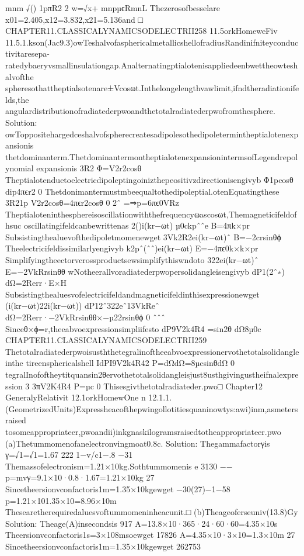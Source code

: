 {{{{{{{{{{{{{{{{mnm
√()
1pπR2
2
w=√x+
mnpµϵRmnL
Thezerosofbesselare
x01=2.405,x12=3.832,x21=5.136and
□
CHAPTER11.CLASSICALYNAMICSODELECTRII258
11.5orkHomeweFiv
11.5.1.kson(Jac9.3)owTeshalvofasphericalmetallicshellofradiusRandinifniteyconductivitaresepa-
ratedybaeryvsmallinsulationgap.Analternatingptialotenisappliedeenbwettheowteshalvofthe
spheresothattheptialsotenare±Vcosωt.Inthelongelengthvawlimit,ifndtheradiationifelds,the
angulardistributionofradiatederpwoandthetotalradiatederpwofromthesphere.
Solution:
owToppositehargedceshalvofspherecreatesadipolesothedipoletermintheptialotenexpansionis
thetdominanterm.ThetdominantermontheptialotenexpansionintermsofLegendrepolynomial
expansionis
3R2
Φ=V2r2cosθ
Theptialotenduetoelectricdipoleptingoinizthepeositivzdirectionisengivyb
Φ1pcosθ
dip4πϵr2
0
Thetdonimantermustmbeequaltothedipoleptial.otenEquatingthese
3R21p
V2r2cosθ=4πϵr2cosθ
0
2ˆ
=⇒p=6πϵ0VRz
Theptialoteninthesphereisoscillationwiththefrequencyωascosωt,Themagneticifeldofhsuc
oscillatingifeldcanbewrittenas
2()i(kr−ωt)
µ0ckpˆˆe
B=4πk×pr
Subsistingthealuevofthedipoletmomenewget
3Vk2R2ei(kr−ωt)ˆ
B=−2crsinθϕ
Theelectricifeldissimilarlyengivyb
k2pˆ(ˆˆ)ei(kr−ωt)
E=−4πϵ0k×k×pr
Simplifyingtheectorvcrossproductsewsimplifythiswndoto
322ei(kr−ωt)ˆ
E=−2VkRrsinθθ
wNotheerallvoradiatederpwopersolidangleisengivyb
dP1(2ˆ∗)
dΩ=2Rerr·E×H
Subsistingthealuesvofelectricifeldandmagneticifeldinthisexpressionewget
({i(kr−ωt)}{22i(kr−ωt)})
dP12ˆ322eˆ13VkReˆ
dΩ=2Rerr·−2VkRrsinθθ×−µ22rsinθϕ
0
ˆˆˆ
Sinceθ×ϕ=r,theeabvoexpressionsimpliifesto
dP9V2k4R4
=sin2θ
dΩ8µ0c
CHAPTER11.CLASSICALYNAMICSODELECTRII259
Thetotalradiatederpwoisusththetegralinoftheeabvoexpressionervothetotalsolidangleinthe
tireensphericalshell
IdPI9V2k4R42
P=dΩdΩ=8µcsinθdΩ
0
tegralInofoftheytitquansin2θervothetotalsolidangleisjust8usthgivingustheifnalexpression
3
3πV2K4R4
P=µc
0
Thisesgivthetotalradiateder.pwo□
Chapter12
GeneralyRelativit
12.1orkHomewOne
n
12.1.1.(GeometrizedUnits)Expressheacofthepwingollotitiesquaninowtys:awi)inm,asmetersraised
tosomeappropriateer,pwoandii)inkgnaskilogramsraisedtotheappropriateer.pwo
(a)Thetummomenofanelectronvingmoat0.8c.
Solution:
Thegammafactorγis
γ=√1=√1=1.67
222
1−v/c1−.8
−31
Themassofelectronism=1.21×10kg.Sothtummomenis
e
3130
−−
p=mvγ=9.1×10·0.8·1.67=1.21×10kg
27
Sincetheersionvconfactoris1m=1.35×10kgewget
−30(27)−1−58
p=1.21×101.35×10=8.96×10m
Thesearetherequiredaluesvoftummomeninheacunit.□
(b)Theageoferseuniv(13.8)Gy
Solution:
Theage(A)insecondsis
917
A=13.8×10·365·24·60·60=4.35×10s
Theersionvconfactoris1s=3×108msoewget
17826
A=4.35×10·3×10=1.3×10m
27
Sincetheersionvconfactoris1m=1.35×10kgewget
262753
}}}}}}}}}}}}}}}}
